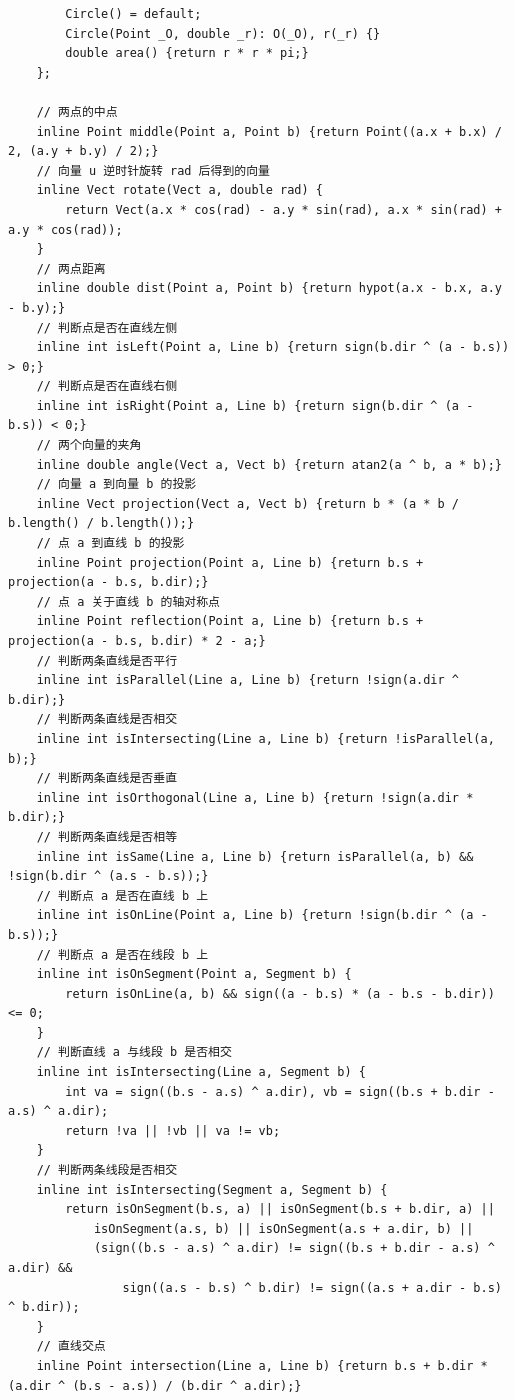 \begin{verbatim}
        Circle() = default;
        Circle(Point _O, double _r): O(_O), r(_r) {}
        double area() {return r * r * pi;}
    };

    // 两点的中点
    inline Point middle(Point a, Point b) {return Point((a.x + b.x) / 2, (a.y + b.y) / 2);}
    // 向量 u 逆时针旋转 rad 后得到的向量
    inline Vect rotate(Vect a, double rad) {
        return Vect(a.x * cos(rad) - a.y * sin(rad), a.x * sin(rad) + a.y * cos(rad));
    }
    // 两点距离
    inline double dist(Point a, Point b) {return hypot(a.x - b.x, a.y - b.y);}
    // 判断点是否在直线左侧
    inline int isLeft(Point a, Line b) {return sign(b.dir ^ (a - b.s)) > 0;}
    // 判断点是否在直线右侧
    inline int isRight(Point a, Line b) {return sign(b.dir ^ (a - b.s)) < 0;}
    // 两个向量的夹角
    inline double angle(Vect a, Vect b) {return atan2(a ^ b, a * b);}
    // 向量 a 到向量 b 的投影
    inline Vect projection(Vect a, Vect b) {return b * (a * b / b.length() / b.length());}
    // 点 a 到直线 b 的投影
    inline Point projection(Point a, Line b) {return b.s + projection(a - b.s, b.dir);}
    // 点 a 关于直线 b 的轴对称点
    inline Point reflection(Point a, Line b) {return b.s + projection(a - b.s, b.dir) * 2 - a;}
    // 判断两条直线是否平行
    inline int isParallel(Line a, Line b) {return !sign(a.dir ^ b.dir);}
    // 判断两条直线是否相交
    inline int isIntersecting(Line a, Line b) {return !isParallel(a, b);}
    // 判断两条直线是否垂直
    inline int isOrthogonal(Line a, Line b) {return !sign(a.dir * b.dir);}
    // 判断两条直线是否相等
    inline int isSame(Line a, Line b) {return isParallel(a, b) && !sign(b.dir ^ (a.s - b.s));}
    // 判断点 a 是否在直线 b 上
    inline int isOnLine(Point a, Line b) {return !sign(b.dir ^ (a - b.s));}
    // 判断点 a 是否在线段 b 上
    inline int isOnSegment(Point a, Segment b) {
        return isOnLine(a, b) && sign((a - b.s) * (a - b.s - b.dir)) <= 0;
    }
    // 判断直线 a 与线段 b 是否相交
    inline int isIntersecting(Line a, Segment b) {
        int va = sign((b.s - a.s) ^ a.dir), vb = sign((b.s + b.dir - a.s) ^ a.dir);
        return !va || !vb || va != vb;
    }
    // 判断两条线段是否相交
    inline int isIntersecting(Segment a, Segment b) {
        return isOnSegment(b.s, a) || isOnSegment(b.s + b.dir, a) ||
            isOnSegment(a.s, b) || isOnSegment(a.s + a.dir, b) ||
            (sign((b.s - a.s) ^ a.dir) != sign((b.s + b.dir - a.s) ^ a.dir) &&
                sign((a.s - b.s) ^ b.dir) != sign((a.s + a.dir - b.s) ^ b.dir));
    }
    // 直线交点
    inline Point intersection(Line a, Line b) {return b.s + b.dir * (a.dir ^ (b.s - a.s)) / (b.dir ^ a.dir);}

\end{verbatim}
